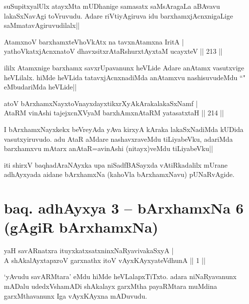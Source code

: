 \begin{artha}
suSupitxyalUlx atayxMta mUDhanige samasatx saMsAragaLa aBAvavu lakaSxNavAgi toVruvudu. Adare riVtiyAgiruva idu barxhamxjAcnxnigaLige saMmatavAgiruvudilalx||
\end{artha}


\begin{shl}
AtamxnoV barxhamxteVhoVkAtx na tavxnAtamxna IritA |\\
yathoVkatxjAcnxnatoV dhavxsitxrAtaRshurxtAyx\s taM ucayxteV \hfill || 213 ||
\end{shl}

\begin{artha}
ililx Atamxnige barxhamx savxrUpavanunx heVLide Adare anAtamx vasutxvige heVLilalx. hiMde heVLida tatavxjAcnxnadiMda anAtamxvu nashisuvudeMdu ``\stext " eMbudariMda heVLide||
\end{artha}

\begin{shl}
atoV bArxhamxNayxtoV\s nayxdayxtikxrXyAkArakalakaSxNamf |\\
AtaRM vinAshi tajejxcnXVyaM barxhAmxnAtaRM yatasatxtaH \hfill || 214 ||
\end{shl}

\begin{artha}
I bArxhamxNayxkekx beVreyAda yAva kirxyA kAraka lakaSxNadiMda kUDida vasutxyiruvudo. adu AtaR aMdare nashavxraveMdu tiLiyabeVku, adariMda barxhamxvu mAtarx anAtaR=avinAshi (nitayx)veMdu tiLiyabeVku|| 
\end{artha}

\begin{center}
iti shirxV baqhadAraNAyxka upa niSadfBASayxda vAtiRkadalilx mUrane adhAyxyada aidane bArxhamxNa (kahoVla bArxhamxNavu) pUNaRvAgide.
\end{center}

\section*{baq. adhAyxya 3 -- bArxhamxNa 6 (gAgiR bArxhamxNa)}%

\begin{shl}
yaH savARnatxra ituyxkatxsatxninxNaRyavivakaSxyA |\\
A shAkalAyxtapxroV garxnathx itoV vAyxKAyxyateV\s dhunA \hfill || 1 ||
\end{shl}

\begin{artha}
`yAvudu savARMtara' eMdu hiMde heVLalapxTiTxto. adara niNaRyavanunx mADalu udedxVshamADi shAkalayx garxMtha payaRMtara muMdina garxMthavanunx Iga vAyxKAyxna mADuvudu.
\end{artha}

